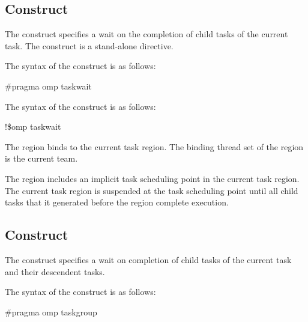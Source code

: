 \subsection{ Construct}
\label{subsec:taskwait Construct}
\summary
The  construct specifies a wait on the completion of child tasks of the 
current task. The  construct is a stand-alone directive.

\syntax
\ccppspecificstart
The syntax of the  construct is as follows:

\begin{boxedcode}
\#pragma omp taskwait 
\end{boxedcode}
\ccppspecificend

\fortranspecificstart
The syntax of the  construct is as follows:

\begin{boxedcode}
!\$omp taskwait 
\end{boxedcode}
\fortranspecificend

\binding
The  region binds to the current task region. The binding thread set of the 
 region is the current team.

\descr

The  region includes an implicit task scheduling point in the current task 
region. The current task region is suspended at the task scheduling point until all child 
tasks that it generated before the  region complete execution.










\subsection{ Construct}
\label{subsec:taskgroup Construct}
\summary
The  construct specifies a wait on completion of child tasks of the current 
task and their descendent tasks.

\syntax
\ccppspecificstart
The syntax of the  construct is as follows:

\begin{boxedcode}
\#pragma omp taskgroup 
\end{boxedcode}
\ccppspecificend

